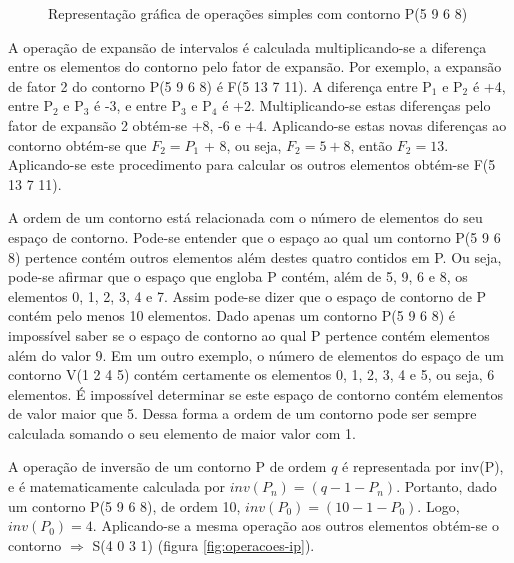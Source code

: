 \begin{figure}
  \centering
  \subfloat[Contorno P]{
    \texttt{[image: c-5968]}
    \label{fig:operacoes-p}
  }
  \subfloat[Inversão de P]{
    \texttt{[image: c-4031]}
    \label{fig:operacoes-ip}
  }

  \subfloat[Retrógrado de P]{
    \texttt{[image: c-8695]}
    \label{fig:operacoes-rp}
  }

  \subfloat[Rotação 1 de P]{
    \texttt{[image: c-9685]}
    \label{fig:operacoes-rr1}
  }
  \subfloat[Rotação 2 de P]{
    \texttt{[image: c-6859]}
    \label{fig:operacoes-rr2}
  }
  \subfloat[Rotação 3 de P]{
    \texttt{[image: c-8596]}
    \label{fig:operacoes-rr3}
  }
  \caption{Representação gráfica de operações simples com contorno P(5
  9 6 8)}
  \label{fig:operacoes-simples}
\end{figure}

A operação de expansão de intervalos é calculada multiplicando-se a
diferença entre os elementos do contorno pelo fator de expansão. Por
exemplo, a expansão de fator 2 do contorno P(5 9 6 8) é F(5 13 7
11). A diferença entre P$_1$ e P$_2$ é +4, entre P$_2$ e P$_3$ é -3, e
entre P$_3$ e P$_4$ é +2. Multiplicando-se estas diferenças pelo fator
de expansão 2 obtém-se +8, -6 e +4. Aplicando-se estas novas
diferenças ao contorno obtém-se que $F_2 = P_1$ + 8, ou seja, $F_2 = 5
+ 8$, então $F_2 = 13$. Aplicando-se este procedimento para calcular
os outros elementos obtém-se F(5 13 7 11).

A ordem de um contorno está relacionada com o número de elementos do
seu espaço de contorno. Pode-se entender que o espaço ao qual um
contorno P(5 9 6 8) pertence contém outros elementos além destes
quatro contidos em P. Ou seja, pode-se afirmar que o espaço que
engloba P contém, além de 5, 9, 6 e 8, os elementos 0, 1, 2, 3, 4 e
7. Assim pode-se dizer que o espaço de contorno de P contém pelo menos
10 elementos. Dado apenas um contorno P(5 9 6 8) é impossível saber se
o espaço de contorno ao qual P pertence contém elementos além do valor
9. Em um outro exemplo, o número de elementos do espaço de um contorno
V(1 2 4 5) contém certamente os elementos 0, 1, 2, 3, 4 e 5, ou seja,
6 elementos. É impossível determinar se este espaço de contorno contém
elementos de valor maior que 5. Dessa forma a ordem de um contorno
pode ser sempre calculada somando o seu elemento de maior valor com 1.

A operação de inversão de um contorno P de ordem $q$ é representada
por inv(P), e é matematicamente calculada por
$inv(P_n)=(q-1-P_n)$. Portanto, dado um contorno P(5 9 6 8), de ordem
10, $inv(P_0)=(10-1-P_0)$. Logo, $inv(P_0)=4$. Aplicando-se a mesma
operação aos outros elementos obtém-se o contorno  $\Rightarrow$ S(4 0 3 1) (figura \ref{fig:operacoes-ip}).

